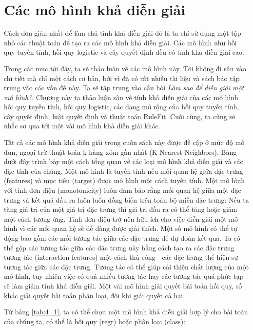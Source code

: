 \chapter{Các mô hình khả diễn giải}
Cách đơn giản nhất để làm chủ tính khả diễn giải đó là ta chỉ sử dụng một tập nhỏ các thuật toán để tạo ra các mô hình khả diễn giải. Các mô hình như hồi quy tuyến tính, hồi quy logistic và cây quyết định đều có tính khả diễn giải cao.

Trong các mục tới đây, ta sẽ thảo luận về các mô hình này. Tôi không đi sâu vào chi tiết mà chỉ một cách cơ bản, bởi vì đã có rất nhiều tài liệu và sách báo tập trung vào các vấn đề này. Ta sẽ tập trung vào câu hỏi \textit{Làm sao để diễn giải một mô hình?}. Chương này ta thảo luận sâu về tính khả diễn giải của các mô hình hồi quy tuyến tính, hồi quy logistic, các dạng mở rộng của hồi quy tuyến tính, cây quyết định, luật quyết định và thuật toán RuleFit. Cuối cùng, ta cũng sẽ nhắc sơ qua tới một vài mô hình khả diễn giải khác. 

Tất cả các mô hình khả diễn giải trong cuốn sách này được đề cập ở mức độ mô đun, ngoại trừ thuật toán k hàng xóm gần nhất (K-Nearest Neighbors). Bảng dưới đây trình bày một cách tổng quan về các loại mô hình khả diễn giải và các đặc tính của chúng. Một mô hình là tuyến tính nếu mối quan hệ giữa đặc trưng (features) và mục tiêu (target) được mô hình một cách tuyến tính. Một mô hình với tính đơn điệu (monotonicity) luôn đảm bảo rằng mối quan hệ giữa một đặc trưng và kết quả đầu ra luôn luôn đồng biến trên toàn bộ miền đặc trưng: Nếu ta tăng giá trị của một giá trị đặc trưng thì giá trị đầu ra có thể tăng hoặc giảm một cách tương ứng. Tính đơn điệu trở nên hữu ích cho việc diễn giải một mô hình vì các mối quan hệ sẽ dễ dàng được giải thích. Một số mô hình có thể tự động bao gồm các mối tương tác giữa các đặc trưng để dự đoán kết quả. Ta có thể gộp các tương tác giữa các đặc trưng này bằng cách tạo ra các đặc trưng tương tác (interaction features) một cách thủ công - các đặc trưng thể hiện sự tương tác giữa các đặc trưng. Tương tác có thể giúp cải thiện chất lượng của một mô hình, tuy nhiên việc có quá nhiều tương tác hay các tương tác quá phức tạp sẽ làm giảm tính khả diễn giải. Một vài mô hình giải quyết bài toán hồi quy, số khác giải quyết bài toán phân loại, đôi khi giải quyết cả hai.

Từ bảng \ref{tab:4_1}, ta có thể chọn một mô hình khả diễn giải hợp lý cho bài toán của chúng ta, có thể là hồi quy (regr) hoặc phân loại (class): 

